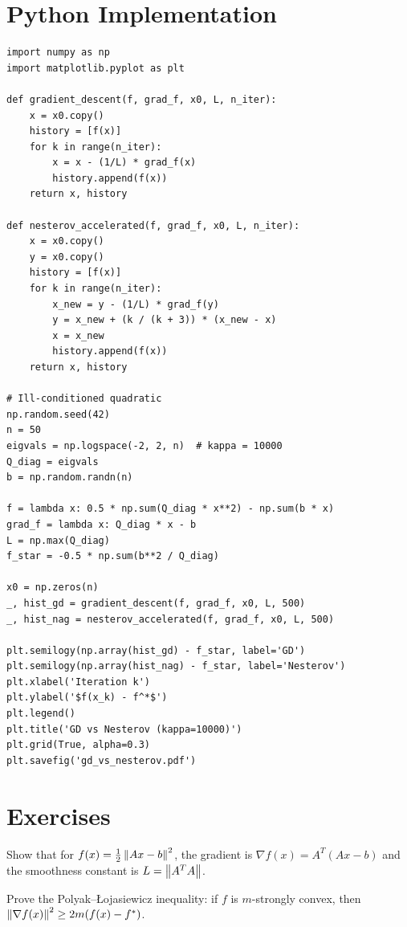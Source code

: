 \section{Python Implementation}

\begin{codeblock}[title=\textbf{Comparison of GD, Nesterov, and SGD}]
\begin{verbatim}
import numpy as np
import matplotlib.pyplot as plt

def gradient_descent(f, grad_f, x0, L, n_iter):
    x = x0.copy()
    history = [f(x)]
    for k in range(n_iter):
        x = x - (1/L) * grad_f(x)
        history.append(f(x))
    return x, history

def nesterov_accelerated(f, grad_f, x0, L, n_iter):
    x = x0.copy()
    y = x0.copy()
    history = [f(x)]
    for k in range(n_iter):
        x_new = y - (1/L) * grad_f(y)
        y = x_new + (k / (k + 3)) * (x_new - x)
        x = x_new
        history.append(f(x))
    return x, history

# Ill-conditioned quadratic
np.random.seed(42)
n = 50
eigvals = np.logspace(-2, 2, n)  # kappa = 10000
Q_diag = eigvals
b = np.random.randn(n)

f = lambda x: 0.5 * np.sum(Q_diag * x**2) - np.sum(b * x)
grad_f = lambda x: Q_diag * x - b
L = np.max(Q_diag)
f_star = -0.5 * np.sum(b**2 / Q_diag)

x0 = np.zeros(n)
_, hist_gd = gradient_descent(f, grad_f, x0, L, 500)
_, hist_nag = nesterov_accelerated(f, grad_f, x0, L, 500)

plt.semilogy(np.array(hist_gd) - f_star, label='GD')
plt.semilogy(np.array(hist_nag) - f_star, label='Nesterov')
plt.xlabel('Iteration k')
plt.ylabel('$f(x_k) - f^*$')
plt.legend()
plt.title('GD vs Nesterov (kappa=10000)')
plt.grid(True, alpha=0.3)
plt.savefig('gd_vs_nesterov.pdf')
\end{verbatim}
\end{codeblock}

\section{Exercises}

\begin{exercise}[$\star$]
Show that for $f(x) = \frac{1}{2}\left\| Ax-b \right\|^2$, the gradient is
$\nabla f(x) = A^T(Ax-b)$ and the smoothness constant is $L = \left\| A^TA \right\|$.
\end{exercise}

\begin{exercise}[$\star\star$]
Prove the Polyak--\L{}ojasiewicz inequality: if $f$ is $m$-strongly convex, then
$\left\| \nabla f(x) \right\|^2 \geq 2m(f(x) - f^*)$.
\end{exercise}

